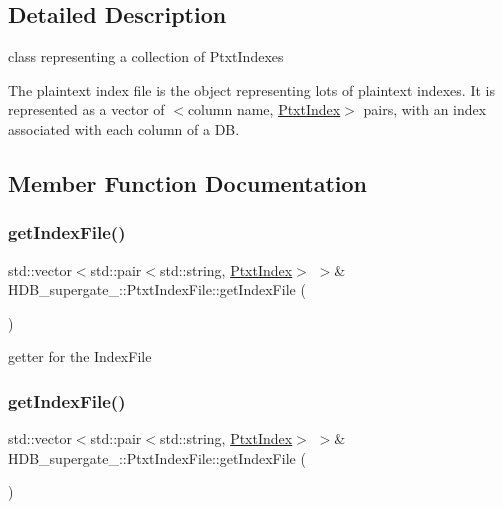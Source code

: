 \subsection{Detailed Description}
class representing a collection of Ptxt\+Indexes 

The plaintext index file is the object representing lots of plaintext indexes. It is represented as a vector of $<$column name, \hyperlink{classHDB__supergate___1_1PtxtIndex}{Ptxt\+Index}$>$ pairs, with an index associated with each column of a DB. 

\subsection{Member Function Documentation}
\mbox{\label{classHDB__supergate___1_1PtxtIndexFile_a8244f5f9995a99571e048cd0d5145245}} 
\subsubsection{\texorpdfstring{get\+Index\+File()}{getIndexFile()}\hspace{0.1cm}{\footnotesize\ttfamily [1/2]}}
{\footnotesize\ttfamily std\+::vector$<$std\+::pair$<$std\+::string, \hyperlink{classHDB__supergate___1_1PtxtIndex}{Ptxt\+Index}$>$ $>$\& H\+D\+B\+\_\+supergate\+\_\+\+::\+Ptxt\+Index\+File\+::get\+Index\+File (\begin{DoxyParamCaption}{ }\end{DoxyParamCaption})\hspace{0.3cm}{\ttfamily [inline]}}

getter for the Index\+File \mbox{\label{classHDB__supergate___1_1PtxtIndexFile_a8244f5f9995a99571e048cd0d5145245}} 
\subsubsection{\texorpdfstring{get\+Index\+File()}{getIndexFile()}\hspace{0.1cm}{\footnotesize\ttfamily [2/2]}}
{\footnotesize\ttfamily std\+::vector$<$std\+::pair$<$std\+::string, \hyperlink{classHDB__supergate___1_1PtxtIndex}{Ptxt\+Index}$>$ $>$\& H\+D\+B\+\_\+supergate\+\_\+\+::\+Ptxt\+Index\+File\+::get\+Index\+File (\begin{DoxyParamCaption}{ }\end{DoxyParamCaption})\hspace{0.3cm}{\ttfamily [inline]}}

